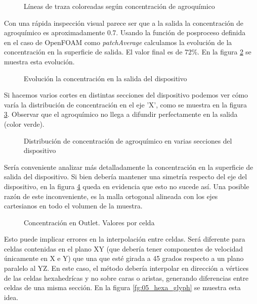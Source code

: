 \documentclass[oneside,a4paper,spanish,links]{amca}
\begin{document}
\begin{figure}[htb]
	\caption{Líneas de traza coloreadas según concentración de agroquímico} \label{fg:05_stream_t}
\end{figure}

Con una rápida inspección visual parece ser que a la salida la concentración de agroquímico es aproximadamente 0.7. Usando la función de posproceso definida en el caso de OpenFOAM como \textit{patchAverage} calculamos la evolución de la concentración en la superficie de salida. El valor final es de 72\%. En la figura \ref{fg:05_avg_T} se muestra esta evolución.


\begin{figure}[htb]
	\centerline{
	}
	\caption{Evolución la concentración en la salida del dispositivo} \label{fg:05_avg_T}
\end{figure}

Si hacemos varios cortes en distintas secciones del dispositivo podemos ver cómo varía la distribución de concentración en el eje 'X', como se muestra en la figura \ref{fg:05_STR_XY}. Observar que el agroquímico no llega a difundir perfectamente en la salida (color verde).


\begin{figure}[htb]
	\centerline{
	}
	\centerline{
	}
	\caption{Distribución de concentración de agroquímico en varias secciones del dispositivo} \label{fg:05_STR_XY}
\end{figure}

Sería conveniente analizar más detalladamente la concentración en la superficie de salida del dispositivo. Si bien debería mantener una simetría respecto del eje del dispositivo, en la figura  \ref{fg:05_outlet} queda en evidencia que esto no sucede así. Una posible razón de este inconveniente, es la malla ortogonal alineada con los ejes cartesianos en todo el volumen de la muestra. 

\begin{figure}[htb]
	\centerline{
	}
	\caption{Concentración en Outlet. Valores por celda} \label{fg:05_outlet}
\end{figure}

Esto puede implicar errores en la interpolación entre celdas. Será diferente para celdas contenidas en el plano XY (que debería tener componentes de velocidad únicamente en X e Y) que una que esté girada a 45 grados respecto a un plano paralelo al YZ. En este caso, el método debería interpolar en dirección a vértices de las celdas hexahedrícas y no sobre caras o aristas, generando diferencias entre celdas de una misma sección. En la figura \ref{fg:05_hexa_glyph} se muestra esta idea.
\end{document}
